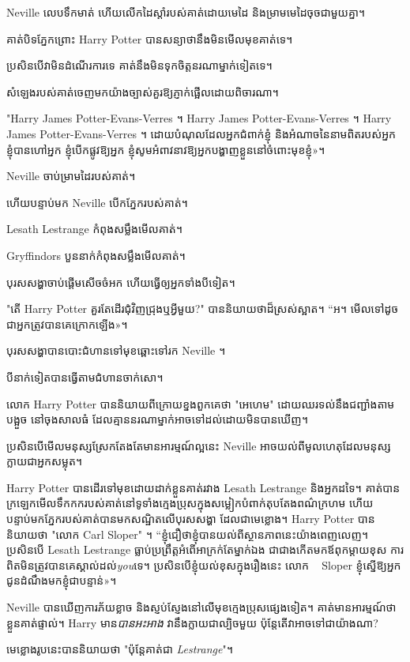 {{{{Neville លេបទឹកមាត់ ហើយលើកដៃស្តាំរបស់គាត់ដោយមេដៃ និងម្រាមមេដៃចុចជាមួយគ្នា។

គាត់បិទភ្នែកព្រោះ Harry Potter បានសន្យាថានឹងមិនមើលមុខគាត់ទេ។

ប្រសិនបើវាមិនដំណើរការទេ គាត់នឹងមិនទុកចិត្តនរណាម្នាក់ទៀតទេ។

សំឡេងរបស់គាត់ចេញមកយ៉ាងច្បាស់គួរឱ្យភ្ញាក់ផ្អើលដោយពិចារណា។

"Harry James Potter-Evans-Verres ។ Harry James Potter-Evans-Verres ។ Harry James Potter-Evans-Verres ។ ដោយ​បំណុល​ដែល​អ្នក​ជំពាក់​ខ្ញុំ និង​អំណាច​នៃ​នាម​ពិត​របស់​អ្នក ខ្ញុំ​បាន​ហៅ​អ្នក ខ្ញុំ​បើក​ផ្លូវ​ឱ្យ​អ្នក ខ្ញុំ​សូម​អំពាវនាវ​ឱ្យ​អ្នក​បង្ហាញ​ខ្លួន​នៅ​ចំពោះ​មុខ​ខ្ញុំ»។

Neville ចាប់ម្រាមដៃរបស់គាត់។

ហើយបន្ទាប់មក Neville បើកភ្នែករបស់គាត់។

Lesath Lestrange កំពុងសម្លឹងមើលគាត់។

Gryffindors បួននាក់កំពុងសម្លឹងមើលគាត់។

បុរសសង្ហាចាប់ផ្តើមសើចចំអក ហើយធ្វើឲ្យអ្នកទាំងបីទៀត។

"តើ Harry Potter គួរតែដើរជុំវិញជ្រុងឬអ្វីមួយ?" បាននិយាយថាដ៏ស្រស់ស្អាត។ “អ។ មើល​ទៅ​ដូច​ជា​អ្នក​ត្រូវ​បាន​គេ​ក្រោក​ឡើង»។

បុរសសង្ហាបានបោះជំហានទៅមុខឆ្ពោះទៅរក Neville ។

បី​នាក់​ទៀត​បាន​ធ្វើ​តាម​ជំហាន​ចាក់សោ។

លោក Harry Potter បាននិយាយពីក្រោយខ្នងពួកគេថា "អេហេម" ដោយឈរទល់នឹងជញ្ជាំងតាមបង្អួច នៅចុងសាលធំ ដែលគ្មាននរណាម្នាក់អាចទៅដល់ដោយមិនបានឃើញ។

ប្រសិនបើ​មើល​មនុស្ស​ស្រែក​តែងតែ​មាន​អារម្មណ៍​ល្អ​នេះ Neville អាច​យល់​ពី​មូលហេតុ​ដែល​មនុស្ស​ក្លាយជា​អ្នក​សម្លុត។

Harry Potter បានដើរទៅមុខដោយដាក់ខ្លួនគាត់រវាង Lesath Lestrange និងអ្នកដទៃ។ គាត់បានក្រឡេកមើលទឹកកករបស់គាត់នៅទូទាំងក្មេងប្រុសក្នុងសម្លៀកបំពាក់តុបតែងពណ៌ក្រហម ហើយបន្ទាប់មកភ្នែករបស់គាត់បានមកសណ្ឋិតលើបុរសសង្ហា ដែលជាមេខ្លោង។ Harry Potter បាននិយាយថា "លោក Carl Sloper" ។ “ខ្ញុំ​ជឿ​ថា​ខ្ញុំ​បាន​យល់​ពី​ស្ថានភាព​នេះ​យ៉ាង​ពេញលេញ។ ប្រសិនបើ Lesath Lestrange ធ្លាប់ប្រព្រឹត្តអំពើអាក្រក់តែម្នាក់ឯង ជាជាងកើតមកឪពុកម្តាយខុស ការពិតមិនត្រូវបានគេស្គាល់ដល់\emph{you}ទេ។ ប្រសិន​បើ​ខ្ញុំ​យល់​ខុស​ក្នុង​រឿង​នេះ លោក ~ Sloper ខ្ញុំ​ស្នើ​ឱ្យ​អ្នក​ជូន​ដំណឹង​មក​ខ្ញុំ​ជា​បន្ទាន់»។

Neville បានឃើញការភ័យខ្លាច និងស្ញប់ស្ញែងនៅលើមុខក្មេងប្រុសផ្សេងទៀត។ គាត់មានអារម្មណ៍ថាខ្លួនគាត់ផ្ទាល់។ Harry មាន\emph{បានអះអាង} វានឹងក្លាយជាល្បិចមួយ ប៉ុន្តែតើវាអាចទៅជាយ៉ាងណា?

មេខ្លោងរូបនេះបាននិយាយថា "ប៉ុន្តែគាត់ជា \emph{Lestrange}"។

}}}}
